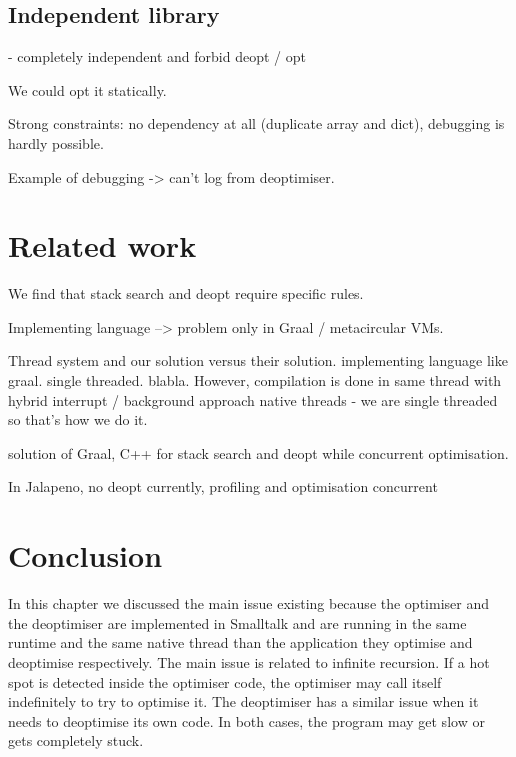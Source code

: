 \documentclass[a4paper,12pt,twoside]{../includes/ThesisStyle}
\begin{document}
\subsection{Independent library}

- completely independent and forbid deopt / opt

We could opt it statically.

Strong constraints: no dependency at all (duplicate array and dict), debugging is hardly possible.

Example of debugging -> can't log from deoptimiser. 


\section{Related work}

We find that stack search and deopt require specific rules. 

Implementing language --> problem only in Graal / metacircular VMs.

Thread system and our solution versus their solution.
implementing language like graal. single threaded. blabla.
However, compilation is done in same thread with hybrid interrupt / background approach
native threads - we are single threaded so that's how we do it.

solution of Graal, C++ for stack search and deopt while concurrent optimisation.

In Jalapeno, no deopt currently, profiling and optimisation concurrent 


\section{Conclusion}

In this chapter we discussed the main issue existing because the optimiser and the deoptimiser are implemented in Smalltalk and are running in the same runtime and the same native thread than the application they optimise and deoptimise respectively. The main issue is related to infinite recursion. If a hot spot is detected inside the optimiser code, the optimiser may call itself indefinitely to try to optimise it. The deoptimiser has a similar issue when it needs to deoptimise its own code. In both cases, the program may get slow or gets completely stuck.
\end{document}
